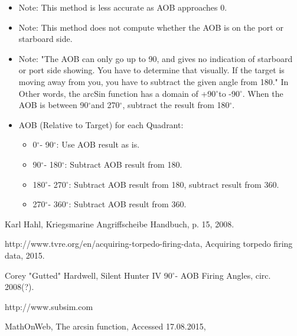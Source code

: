 \documentclass{article}
\newcommand{\degree}{$^{\circ}$}
\begin{document}
\begin{itemize}
\item{Note: This method is less accurate as AOB approaches 0.}
\item{Note: This method does not compute whether the AOB is on the port or starboard side.}
\item{Note: "The AOB can only go up to 90, and gives no indication of starboard or port side showing. You have to determine that visually. If the target is moving away from you, you have to subtract the given angle from 180."\cite[p~15]{angrHandB, tvreAcqData} In Other words, the arcSin function has a domain of +90\degree to -90\degree. When the AOB is between 90\degree and 270\degree, subtract the result from 180\degree. \cite{arcSin}}

\item{AOB (Relative to Target) for each Quadrant:}
\begin{itemize}
	\item{0\degree - 90\degree : Use AOB result as is.}
	\item{90\degree - 180\degree : Subtract AOB result 				 from 180.}
	\item{180\degree - 270\degree : Subtract AOB result from 180, subtract result from 360.}
	\item{270\degree - 360\degree : Subtract AOB result from 360.}
	\end{itemize}

\end{itemize}

\begin{thebibliography}{9}

  Karl Hahl,
  Kriegsmarine Angriffscheibe Handbuch,
  p. 15,
  2008.
  
http://www.tvre.org/en/acquiring-torpedo-firing-data,
Acquiring torpedo firing data,
2015.

Corey "Gutted" Hardwell,
Silent Hunter IV 90\degree - AOB Firing Angles,
circ. 2008(?).

http://www.subsim.com

MathOnWeb,
The arcsin function,
Accessed 17.08.2015,


\end{thebibliography}
\end{document}
